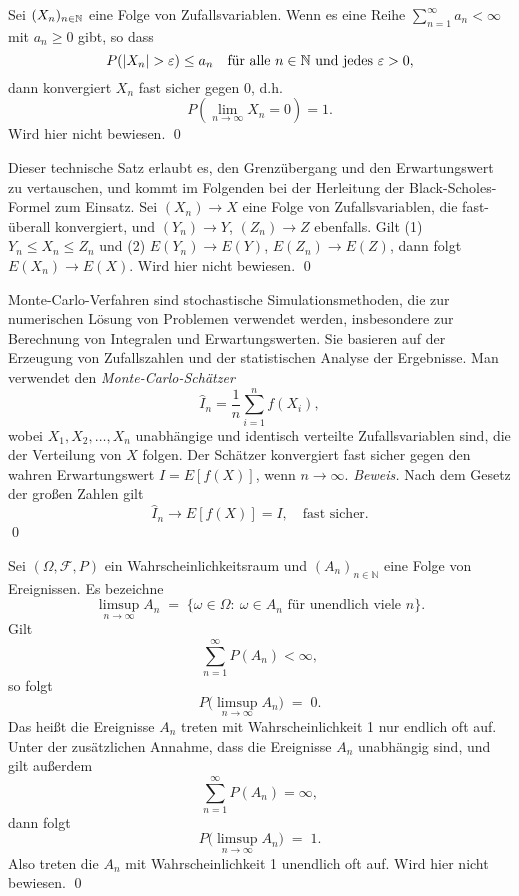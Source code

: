 \begin{lemma}\label{lemma:reihenkriterium}
Sei $(X_n)_{n \in \Bbb N}$ eine Folge von Zufallsvariablen. Wenn es eine Reihe $\sum_{n=1}^\infty a_n \lt \infty$ mit $a_n \geq 0$ gibt, so dass
$$P(|X_n| > \varepsilon) \leq a_n \quad \text{für alle } n \in \Bbb N \text{ und jedes } \varepsilon > 0,$$
dann konvergiert $X_n$ fast sicher gegen $0$, d.h.
$$P\left(\lim_{n \to \infty} X_n = 0\right) = 1.$$
Wird hier nicht bewiesen. \qed
\end{lemma}

\begin{satz}\label{satz:pratt}
Dieser technische Satz erlaubt es, den Grenzübergang und den Erwartungswert zu vertauschen, und
kommt im Folgenden bei der Herleitung der Black-Scholes-Formel zum Einsatz.
Sei $(X_n) \longrightarrow X$ eine Folge von Zufallsvariablen, die fast-überall konvergiert,
und $(Y_n) \longrightarrow Y$, $(Z_n) \longrightarrow Z$ ebenfalls.
Gilt (1) $Y_n \le X_n \le Z_n$ und (2) $E(Y_n) \longrightarrow E(Y)$, $E(Z_n) \longrightarrow E(Z)$,
dann folgt $E(X_n) \longrightarrow E(X)$. Wird hier nicht bewiesen. \qed
\end{satz}

\begin{defprop}\label{def:monte_carlo}
Monte-Carlo-Verfahren sind stochastische Simulationsmethoden, die zur numerischen
Lösung von Problemen verwendet werden, insbesondere zur Berechnung von Integralen
und Erwartungswerten. Sie basieren auf der Erzeugung von Zufallszahlen und
der statistischen Analyse der Ergebnisse. Man verwendet den \textit{Monte-Carlo-Schätzer}
$$
\hat{I}_n = \frac{1}{n} \sum_{i=1}^n f(X_i),
$$
wobei $X_1, X_2, \ldots, X_n$ unabhängige und identisch verteilte Zufallsvariablen
sind, die der Verteilung von $X$ folgen. Der Schätzer konvergiert fast sicher
gegen den wahren Erwartungswert $I = E[f(X)]$, wenn $n \to \infty$.
\textit{Beweis.} Nach dem Gesetz der großen Zahlen gilt
$$\hat{I}_n \longrightarrow E[f(X)] = I, \quad \text{fast sicher.}$$ \qed
\end{defprop}

\begin{satz}\label{satz:borel_cantelli}
Sei $(\Omega,\mathcal F, P)$ ein Wahrscheinlichkeitsraum und $(A_n)_{n\in\mathbb N}$ eine Folge von Ereignissen. Es bezeichne
$$
\limsup_{n\to\infty} A_n \;=\; \{\omega\in\Omega:\ \omega\in A_n\text{ für unendlich viele }n\}.
$$
Gilt
$$
\sum_{n=1}^\infty P(A_n) < \infty,
$$
so folgt
$$
P\bigl(\limsup_{n\to\infty} A_n\bigr) \;=\; 0.
$$
Das heißt die Ereignisse $A_n$ treten mit Wahrscheinlichkeit 1 nur endlich oft auf. Unter der zusätzlichen Annahme, dass die Ereignisse $A_n$ unabhängig sind, und gilt außerdem
$$\sum_{n=1}^\infty P(A_n) = \infty,$$
dann folgt
$$
P\bigl(\limsup_{n\to\infty} A_n\bigr) \;=\; 1.
$$
Also treten die $A_n$ mit Wahrscheinlichkeit 1 unendlich oft auf. Wird hier nicht bewiesen. \qed
\end{satz}

